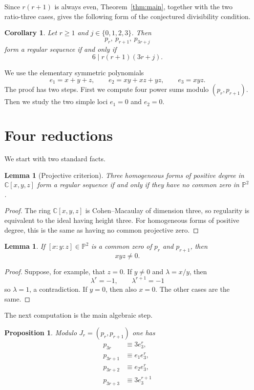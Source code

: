 \documentclass[preprint,12pt]{elsarticle}
\newtheorem{proposition}[theorem]{Proposition}
\newtheorem{lemma}[theorem]{Lemma}
\newtheorem{corollary}[theorem]{Corollary}
\newcommand{\C}{\mathbb C}
\newcommand{\PP}{\mathbb P}
\begin{document}
Since $r(r+1)$ is always even, Theorem~\ref{thm:main}, together with the two
ratio-three cases, gives the following form of the conjectured divisibility
condition.

\begin{corollary}\label{cor:four-shifts}
Let $r\geq1$ and $j\in\{0,1,2,3\}$. Then
$$
p_r,\ p_{r+1},\ p_{3r+j}
$$
form a regular sequence if and only if
$$
6\mid r(r+1)(3r+j).
$$
\end{corollary}

We use the elementary symmetric polynomials
$$
e_1=x+y+z,\qquad e_2=xy+xz+yz,\qquad e_3=xyz.
$$
The proof has two steps. First we compute four power sums modulo
$(p_r,p_{r+1})$. Then we study the two simple loci $e_1=0$ and $e_2=0$.

\section{Four reductions}

We start with two standard facts.

\begin{lemma}[Projective criterion]\label{lem:projective}
Three homogeneous forms of positive degree in $\C[x,y,z]$ form a regular
sequence if and only if they have no common zero in $\PP^2$.
\end{lemma}

\begin{proof}
The ring $\C[x,y,z]$ is Cohen--Macaulay of dimension three, so regularity is
equivalent to the ideal having height three. For homogeneous forms of positive
degree, this is the same as having no common projective zero.
\end{proof}

\begin{lemma}\label{lem:torus}
If $[x:y:z]\in\PP^2$ is a common zero of $p_r$ and $p_{r+1}$, then
$$
xyz\neq0.
$$
\end{lemma}

\begin{proof}
Suppose, for example, that $z=0$. If $y\neq0$ and $\lambda=x/y$, then
$$
\lambda^r=-1,\qquad \lambda^{r+1}=-1
$$
so $\lambda=1$, a contradiction. If $y=0$, then also $x=0$. The other cases
are the same.
\end{proof}

The next computation is the main algebraic step.

\begin{proposition}\label{prop:reductions}
Modulo $J_r=(p_r,p_{r+1})$ one has
\begin{align}
p_{3r}&\equiv3e_3^r,\label{eq:red0}\\
p_{3r+1}&\equiv e_1e_3^r,\label{eq:red1}\\
p_{3r+2}&\equiv e_2e_3^r,\label{eq:red2}\\
p_{3r+3}&\equiv3e_3^{r+1}\label{eq:red3}
\end{align}
\end{proposition}
\end{document}
